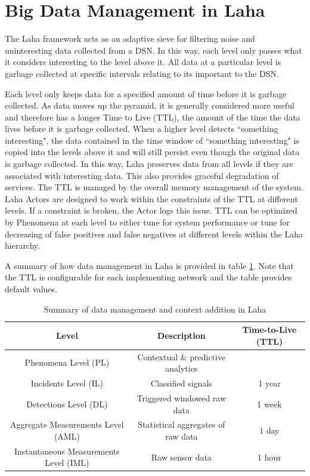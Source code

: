 \section{Big Data Management in Laha} \label{big-data-management}
The Laha framework acts as an adaptive sieve for filtering noise and uninteresting data collected from a DSN. In this way, each level only passes what it considers interesting to the level above it. All data at a particular level is garbage collected at specific intervals relating to its important to the DSN.

Each level only keeps data for a specified amount of time before it is garbage collected. As data moves up the pyramid, it is generally considered more useful and therefore has a longer Time to Live (TTL), the amount of the time the data lives before it is garbage collected.  When a higher level detects ``something interesting", the data contained in the time window of ``something interesting" is copied into the levels above it and will still persist even though the original data is garbage collected. In this way, Laha preserves data from all levels if they are associated with interesting data. This also provides graceful degradation of services. The TTL is managed by the overall memory management of the system. Laha Actors are designed to work within the constraints of the TTL at different levels. If a constraint is broken, the Actor logs this issue. TTL can be optimized by Phenomena at each level to either tune for system performance or tune for decreasing of false positives and false negatives at different levels within the Laha hierarchy.

A summary of how data management in Laha is provided in table \ref{data-managament-table}. Note that the TTL is configurable for each implementing network and the table provides default values.

\begin{table}
	\caption{Summary of data management and context addition in Laha}
	\begin{tabular}{|c|c|c|}
		\hline 
		Level & Description & Time-to-Live (TTL) \\ 
		\hline 
		Phenomena Level (PL) & Contextual \& predictive analytics &  \\ 
		\hline 
		Incidents Level (IL) & Classified signals &  1 year \\ 
		\hline 
		Detections Level (DL) & Triggered windowed raw data & 1 week  \\ 
		\hline 
		Aggregate Measurements Level (AML) & Statistical aggregates of raw data  & 1 day  \\ 
		\hline 
		Instantaneous Measurements Level (IML) & Raw sensor data  & 1 hour \\ 
		\hline 
	\end{tabular} 
    \label{data-managament-table}
\end{table}

